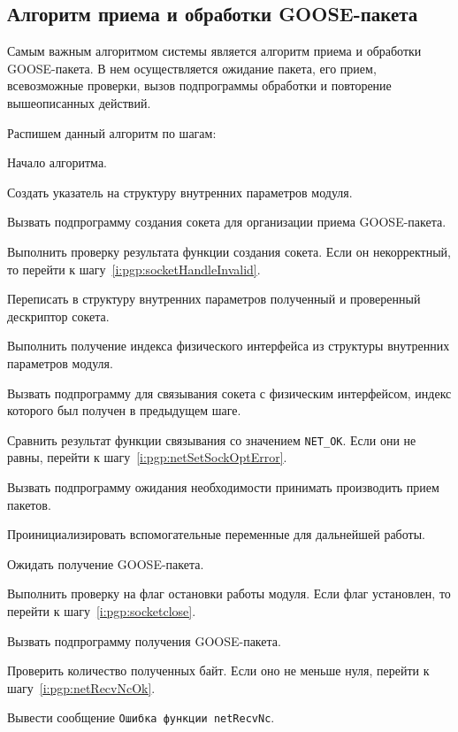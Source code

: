 \subsection{Алгоритм приема и обработки GOOSE-пакета}

Самым важным алгоритмом системы является алгоритм приема и обработки GOOSE-пакета. В нем осуществляется ожидание пакета, его прием, всевозможные проверки, вызов подпрограммы обработки и повторение вышеописанных действий.

Распишем данный алгоритм по шагам:
\begin{enumerate_step}
    \item Начало алгоритма.
    \item \label{i:pgp:createPointerStr} Создать указатель на структуру внутренних параметров модуля.
    \item \label{i:pgp:createSocket} Вызвать подпрограмму создания сокета для организации приема GOOSE-пакета.
    \item Выполнить проверку результата функции создания сокета. Если он некорректный, то перейти к шагу~\ref{i:pgp:socketHandleInvalid}.
    \item Переписать в структуру внутренних параметров полученный и проверенный дескриптор сокета.
    \item Выполнить получение индекса физического интерфейса из структуры внутренних параметров модуля.
    \item Вызвать подпрограмму для связывания сокета с физическим интерфейсом, индекс которого был получен в предыдущем шаге.
    \item Сравнить результат функции связывания со значением \lstinline{NET_OK}. Если они не равны, перейти к шагу~\ref{i:pgp:netSetSockOptError}.
    \item Вызвать подпрограмму ожидания необходимости принимать производить прием пакетов.
    \item Проинициализировать вспомогательные переменные для дальнейшей работы.
    \item \label{i:pgp:processGoosePacket} Ожидать получение GOOSE-пакета.
    \item Выполнить проверку на флаг остановки работы модуля. Если флаг установлен, то перейти к шагу~\ref{i:pgp:socketclose}.
    \item Вызвать подпрограмму получения GOOSE-пакета.
    \item Проверить количество полученных байт. Если оно не меньше нуля, перейти к шагу~\ref{i:pgp:netRecvNcOk}.
    \item Вывести сообщение \texttt{Ошибка функции netRecvNc}.

\end{enumerate_step}
